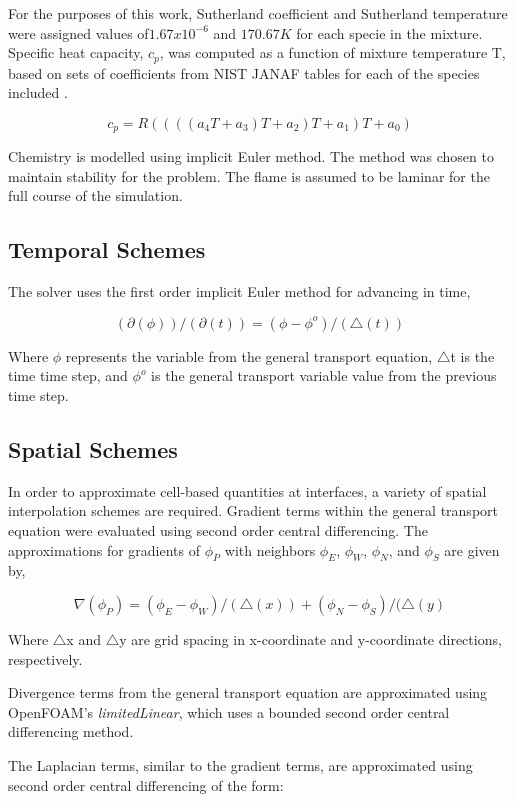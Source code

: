 \documentclass[3p,times,twocolumn]{elsarticle}
\begin{document}
For the purposes of this work, Sutherland coefficient and Sutherland temperature were assigned values of$1.67x10^{-6}$ and $170.67 K$ for each specie in the mixture. Specific heat capacity, $c_{p}$, was computed as a function of mixture temperature T, based on sets of coefficients from NIST JANAF tables for each of the species included \cite{Janaf}. 

\[c_{p} = R((((a_{4}T + a_{3})T + a_{2})T + a_{1})T+ a_{0})\]

Chemistry is modelled using implicit Euler method. The method was chosen to maintain stability for the problem. The flame is assumed to be laminar for the full course of the simulation.


\subsection{Temporal Schemes}
The solver uses the first order implicit Euler method for advancing in time, 

\[(\partial(\phi))/(\partial(t)) = (\phi - \phi^{o})/(\triangle(t))\]

Where $\phi$ represents the variable from the general transport equation, $\triangle$t is the time time step, and $\phi^{o}$ is the general transport variable value from the previous time step.

\subsection{Spatial Schemes}

In order to approximate cell-based quantities at interfaces, a variety of spatial interpolation schemes are required. Gradient terms within the general transport equation were evaluated using second order central differencing. The approximations for gradients of $\phi_{P}$ with neighbors $\phi_{E}$, $\phi_{W}$, $\phi_{N}$, and $\phi_{S}$ are given by,

\[\nabla(\phi_{P}) = (\phi_{E} - \phi_{W})/(\triangle(x)) + (\phi_{N} - \phi_{S})/(\triangle(y)\]


Where $\triangle$x and $\triangle$y are grid spacing in x-coordinate and y-coordinate directions, respectively.

Divergence terms from the general transport equation are approximated using OpenFOAM's \textit{limitedLinear}, which uses a bounded second order central differencing method.

The Laplacian terms, similar to the gradient terms, are approximated using second order central differencing of the form:
\end{document}
